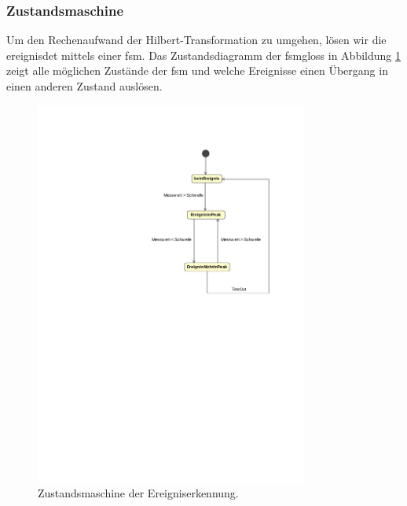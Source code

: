 \subsubsection{Zustandsmaschine}
Um den Rechenaufwand der Hilbert-Transformation zu umgehen, lösen wir die \gls{ereignisdet} mittels einer \gls{fsm}. Das Zustandsdiagramm der \gls{fsmgloss} in Abbildung \ref{fig.fsm_impact_detection} zeigt alle möglichen Zustände der \gls{fsm} und welche Ereignisse einen Übergang in einen anderen Zustand auslösen.
\begin{figure}
	\centering
		\includegraphics[width=0.8\textwidth]{images/magicdraw/Ereigniserkennung.pdf}
	\caption{Zustandsmaschine der Ereigniserkennung.}
	\label{fig.fsm_impact_detection}
\end{figure}

